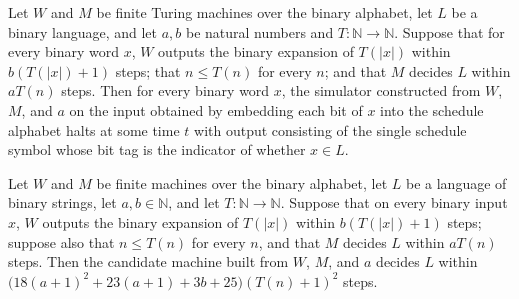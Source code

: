 \begin{lemma}
\label{Complexity.dataTM_computes}
\leanok
{}
Let $W$ and $M$ be finite Turing machines over the binary alphabet, let $L$ be a binary
language, and let $a,b$ be natural numbers and $T:\mathbb{N}\to\mathbb{N}$. Suppose that
for every binary word $x$, $W$ outputs the binary expansion of $T(|x|)$ within
$b(T(|x|)+1)$ steps; that $n\le T(n)$ for every $n$; and that $M$ decides $L$ within
$aT(n)$ steps. Then for every binary word $x$, the simulator constructed from $W$, $M$,
and $a$ on the input obtained by embedding each bit of $x$ into the schedule alphabet
halts at some time $t$ with output consisting of the single schedule symbol whose bit
tag is the indicator of whether $x\in L$.
\end{lemma}

\begin{lemma}
\label{Complexity.obliviousCandidate_decides}
\leanok
{}
Let $W$ and $M$ be finite machines over the binary alphabet, let $L$ be a language of
binary strings, let $a,b \in \mathbb{N}$, and let $T:\mathbb{N}\to\mathbb{N}$. Suppose
that on every binary input $x$, $W$ outputs the binary expansion of $T(|x|)$ within
$b(T(|x|)+1)$ steps; suppose also that $n\le T(n)$ for every $n$, and that $M$ decides
$L$ within $aT(n)$ steps. Then the candidate machine built from $W$, $M$, and $a$
decides $L$ within $\bigl(18(a+1)^2+23(a+1)+3b+25\bigr)(T(n)+1)^2$ steps.
\end{lemma}

